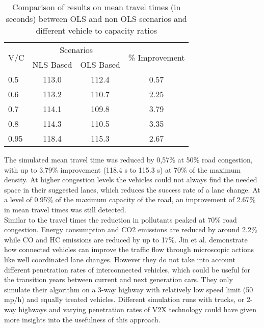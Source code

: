 \documentclass{sig-alternate}
\begin{document}
\begin{table}
\centering
\caption{Comparison of results on mean travel times (in seconds) between OLS and non OLS scenarios and different vehicle to capacity ratios}
\begin{tabular}{|l|c|c|c|}
\hline
\multirow{2}{*}{V/C} & \multicolumn{2}{c|}{Scenarios} & \multirow{2}{*}{\% Improvement} \\ \cline{2-3}
                     & NLS Based      & OLS Based     &                                 \\ \hline
0.5                  & 113.0          & 112.4         & 0.57                            \\ \hline
0.6                  & 113.2          & 110.7         & 2.25                            \\ \hline
0.7                  & 114.1          & 109.8         & 3.79                            \\ \hline
0.8                  & 114.3          & 110.5         & 3.35                            \\ \hline
0.95                 & 118.4          & 115.3         & 2.67                            \\ \hline
\end{tabular}
\label{table1}
\end{table}
The simulated mean travel time was reduced by 0,57\% at 50\% road congestion, with up to 3.79\% improvement (118.4 s to 115.3 s) at 70\% of the maximum density. At higher congestion levels the vehicles could not always find the needed space in their suggested lanes, which reduces the success rate of a lane change. At a level of 0.95\% of the maximum capacity of the road, an improvement of 2.67\% in mean travel times was still detected. \\
Similar to the travel times the reduction in pollutants peaked at 70\% road congestion. Energy consumption and CO2 emissions are reduced by around 2.2\% while CO and HC emissions are reduced by up to 17\%. Jin et al. demonstrate how connected vehicles can improve the traffic flow through microscopic actions like well coordinated lane changes. However they do not take into account different penetration rates of interconnected vehicles, which could be useful for the transition years between current and next generation cars. They only simulate their algorithm on a 3-way highway with relatively low speed limit (50 mp/h) and equally treated vehicles. Different simulation runs with trucks, or 2-way highways and  varying penetration rates of V2X technology could have given more insights into the usefulness of this approach. 
\end{document}
